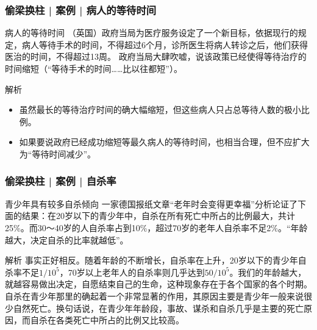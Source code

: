 \begin{frame}
  \frametitle{偷梁换柱 | 案例 | 病人的等待时间}
  \begin{block}{病人的等待时间}
    （英国）政府当局为医疗服务设定了一个新目标，依据现行的规定，病人等待手术的时间，不得超过6个月，诊所医生将病人转诊之后，他们获得医治的时间，不得超过13周。
    政府当局大肆吹嘘，说该政策已经使得等待治疗的时间缩短（“等待手术的时间……比以往都短”）。
  \end{block}
  \pause \pause \pause \pause
  \begin{block}{解析}
    \begin{itemize}
      \item 虽然最长的等待治疗时间的确大幅缩短，但这些病人只占总等待人数的极小比例。
      \item 如果要说政府已经成功缩短等最久病人的等待时间，也相当合理，但不应扩大为“等待时间减少”。
    \end{itemize}
  \end{block}
\end{frame}

\begin{frame}
  \frametitle{偷梁换柱 | 案例 | 自杀率}
  \begin{block}{青少年具有较多自杀倾向}
    一家德国报纸文章“老年时会变得更幸福”分析论证了下面的结果：在20岁以下的青少年中，自杀在所有死亡中所占的比例最大，共计25\%。而30～40岁的人自杀率占到10\%，超过70岁的老年人自杀率不足2\%。“年龄越大，决定自杀的比率就越低”。
  \end{block}
  \pause \pause \pause \pause
  \begin{block}{解析}
    事实正好相反。随着年龄的不断增长，自杀率在上升，20岁以下的青少年自杀率不足$1/10^5$，70岁以上老年人的自杀率则几乎达到$50/10^5$。我们的年龄越大，就越容易做出决定，自愿结束自己的生命，这种现象存在于各个国家的各个时期。\\
    \vspace{0.3em}
自杀在青少年那里的确起着一个非常显著的作用，其原因主要是青少年一般来说很少自然死亡。换句话说，在青少年年龄段，事故、谋杀和自杀几乎是主要的死亡原因，而自杀在各类死亡中所占的比例又比较高。
  \end{block}
\end{frame}

